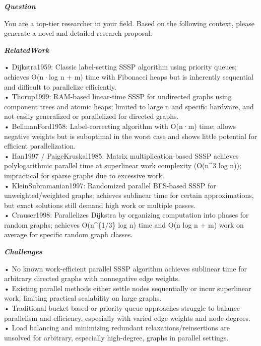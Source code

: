 \begin{tcolorbox}[
    breakable,
    title={Example of Idea Generation in Math},
    colback=LighterGray,
    colframe=DeepPurple,
    colbacktitle=DeepPurple,
    coltitle=White,
]
\textbf{\emph{\textcolor{DeepPurple}{Question}}}

You are a top-tier researcher in your field. Based on the following context, please generate a novel and detailed research proposal.

\textbf{\emph{\textcolor{CaseOrange}{RelatedWork}}}

• Dijkstra1959: Classic label-setting SSSP algorithm using priority queues; achieves O(n·log n + m) time with Fibonacci heaps but is inherently sequential and difficult to parallelize efficiently. \\
• Thorup1999: RAM-based linear-time SSSP for undirected graphs using component trees and atomic heaps; limited to large n and specific hardware, and not easily generalized or parallelized for directed graphs. \\
• BellmanFord1958: Label-correcting algorithm with O(n·m) time; allows negative weights but is suboptimal in the worst case and shows little potential for efficient parallelization. \\
• Han1997 / PaigeKruskal1985: Matrix multiplication-based SSSP achieves polylogarithmic parallel time at superlinear work complexity (O(n\^{}3 log n)); impractical for sparse graphs due to excessive work. \\
• KleinSubramanian1997: Randomized parallel BFS-based SSSP for unweighted/weighted graphs; achieves sublinear time for certain approximations, but exact solutions still demand high work or multiple passes. \\
• Crauser1998: Parallelizes Dijkstra by organizing computation into phases for random graphs; achieves O(n\^{}\{1/3\} log n) time and O(n log n + m) work on average for specific random graph classes. 

\textbf{\emph{\textcolor{CaseOrange}{Challenges}}}

• No known work-efficient parallel SSSP algorithm achieves sublinear time for arbitrary directed graphs with nonnegative edge weights. \\
• Existing parallel methods either settle nodes sequentially or incur superlinear work, limiting practical scalability on large graphs. \\
• Traditional bucket-based or priority queue approaches struggle to balance parallelism and efficiency, especially with varied edge weights and node degrees. \\
• Load balancing and minimizing redundant relaxations/reinsertions are unsolved for arbitrary, especially high-degree, graphs in parallel settings. 


\end{tcolorbox}
